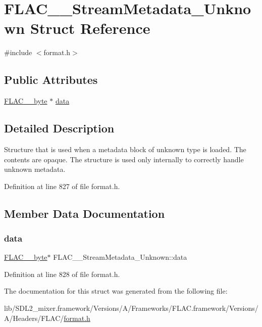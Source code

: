 \hypertarget{struct_f_l_a_c_____stream_metadata___unknown}{}\section{F\+L\+A\+C\+\_\+\+\_\+\+Stream\+Metadata\+\_\+\+Unknown Struct Reference}
\label{struct_f_l_a_c_____stream_metadata___unknown}


{\ttfamily \#include $<$format.\+h$>$}

\subsection*{Public Attributes}
\begin{DoxyCompactItemize}
\item 
\mbox{\hyperlink{ordinals_8h_a5eb569b12d5b047cdacada4d57924ee3}{F\+L\+A\+C\+\_\+\+\_\+byte}} $\ast$ \mbox{\hyperlink{struct_f_l_a_c_____stream_metadata___unknown_aacb09432bd01f2edcb5cebfc71efd79e}{data}}
\end{DoxyCompactItemize}


\subsection{Detailed Description}
Structure that is used when a metadata block of unknown type is loaded. The contents are opaque. The structure is used only internally to correctly handle unknown metadata. 

Definition at line 827 of file format.\+h.



\subsection{Member Data Documentation}
\mbox{\label{struct_f_l_a_c_____stream_metadata___unknown_aacb09432bd01f2edcb5cebfc71efd79e}} 
\subsubsection{\texorpdfstring{data}{data}}
{\footnotesize\ttfamily \mbox{\hyperlink{ordinals_8h_a5eb569b12d5b047cdacada4d57924ee3}{F\+L\+A\+C\+\_\+\+\_\+byte}}$\ast$ F\+L\+A\+C\+\_\+\+\_\+\+Stream\+Metadata\+\_\+\+Unknown\+::data}



Definition at line 828 of file format.\+h.



The documentation for this struct was generated from the following file\+:\begin{DoxyCompactItemize}
\item 
lib/\+S\+D\+L2\+\_\+mixer.\+framework/\+Versions/\+A/\+Frameworks/\+F\+L\+A\+C.\+framework/\+Versions/\+A/\+Headers/\+F\+L\+A\+C/\mbox{\hyperlink{format_8h}{format.\+h}}\end{DoxyCompactItemize}
